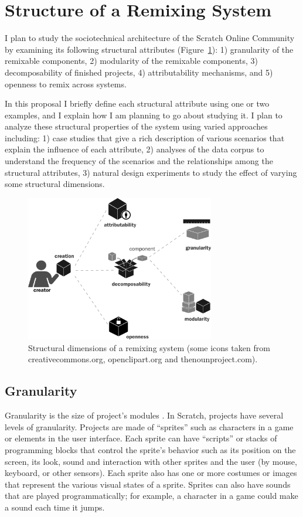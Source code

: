 \section{Structure of a Remixing System} 
I plan to study the sociotechnical architecture of the Scratch Online Community by examining its following structural attributes (Figure~\ref{fig:structure}):
1) granularity of the remixable components, 
2) modularity of the remixable components, 
3) decomposability of finished projects, 
4) attributability mechanisms, and 
5) openness to remix across systems.

In this proposal I briefly define each structural attribute using one or two examples, and I explain how I am planning to go about studying it.
I plan to analyze these structural properties of the system using varied approaches including:
1) case studies that give a rich description of various scenarios that explain the influence of each attribute,
2) analyses of the data corpus to understand the frequency of the scenarios and the relationships among the structural attributes,
3) natural design experiments to study the effect of varying some structural dimensions.

\begin{figure} 
\centering
\includegraphics[width=3.25in]{figures/structure.pdf}
\caption{Structural dimensions of a remixing system (some icons taken from creativecommons.org, openclipart.org and thenounproject.com).}
\label{fig:structure}
\end{figure}

\subsection{Granularity}
Granularity is the size of project's modules \citep{benkler_coases_2002}. 
In Scratch, projects have several levels of granularity.
Projects are made of ``sprites'' such as characters in a game or elements in the user interface.
Each sprite can have ``scripts'' or stacks of programming blocks that control the sprite's behavior such as its position on the screen, its look, sound and interaction with other sprites and the user (by mouse, keyboard, or other sensors).
Each sprite also has one or more costumes or images that represent the various visual states of a sprite.
Sprites can also have sounds that are played programmatically; for example, a character in a game could make a sound each time it jumps.

